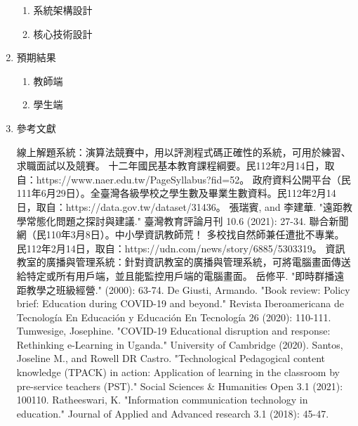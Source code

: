 \documentclass[12pt]{article}
\begin{document}
\begin{enumerate}
\begin{enumerate}
      \item 系統架構設計

      \item 核心技術設計

    \end{enumerate}

  \item 預期結果
    \begin{enumerate}
      \setlength{\parindent}{2em}
      \item 教師端
      \item 學生端
    \end{enumerate}

  \item 參考文獻
    \renewcommand{\section}[2]{}
    \begin{thebibliography}{99}  
       線上解題系統：演算法競賽中，用以評測程式碼正確性的系統，可用於練習、求職面試以及競賽。
       十二年國民基本教育課程綱要。民112年2月14日，取自：https://www.naer.edu.tw/PageSyllabus?fid=52。
       政府資料公開平台（民111年6月29日）。全臺灣各級學校之學生數及畢業生數資料。民112年2月14日，取自：https://data.gov.tw/dataset/31436。
       張瑞賓, and 李建華. "遠距教學常態化問題之探討與建議." 臺灣教育評論月刊 10.6 (2021): 27-34.
       聯合新聞網（民110年3月8日）。中小學資訊教師荒！ 多校找自然師兼任遭批不專業。民112年2月14日，取自：https://udn.com/news/story/6885/5303319。
       資訊教室的廣播與管理系統：針對資訊教室的廣播與管理系統，可將電腦畫面傳送給特定或所有用戶端，並且能監控用戶端的電腦畫面。
       岳修平. "即時群播遠距教學之班級經營." (2000): 63-74.
       De Giusti, Armando. "Book review: Policy brief: Education during COVID-19 and beyond." Revista Iberoamericana de Tecnología En Educación y Educación En Tecnología 26 (2020): 110-111.
       Tumwesige, Josephine. "COVID-19 Educational disruption and response: Rethinking e-Learning in Uganda." University of Cambridge (2020).
       Santos, Joseline M., and Rowell DR Castro. "Technological Pedagogical content knowledge (TPACK) in action: Application of learning in the classroom by pre-service teachers (PST)." Social Sciences \& Humanities Open 3.1 (2021): 100110.
       Ratheeswari, K. "Information communication technology in education." Journal of Applied and Advanced research 3.1 (2018): 45-47.

\end{thebibliography}
\end{enumerate}
\end{document}
